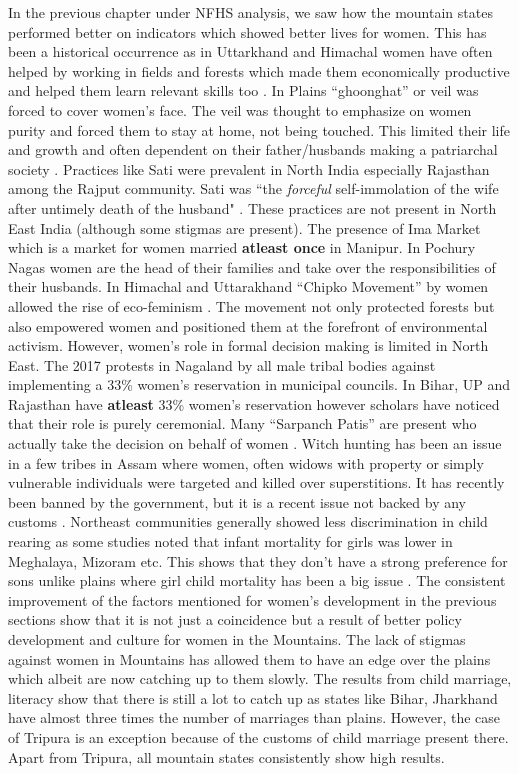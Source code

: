 In the previous chapter under NFHS analysis, we saw how the mountain states performed better on indicators which showed better lives for women. This has been a historical occurrence as in Uttarkhand and Himachal women have often helped by  working in fields and forests which made them economically productive and helped them learn relevant skills too \citep{gooch2014daughters}. In Plains ``ghoonghat'' or veil was forced to cover women's face. The veil was thought to emphasize on women purity and forced them to stay at home, not being touched. This limited their life and growth and often dependent on their father/husbands making a patriarchal society \citep{chowdhry1993persistence}. Practices like Sati were prevalent in North India especially Rajasthan among the Rajput community. Sati was ``the \textit{forceful} self-immolation of the wife after  untimely death of the husband" \citep{sangari1981sati}. These practices are not present in North East India (although some stigmas are present). The presence of Ima Market which is a market for  women married \textbf{atleast once} in Manipur. In Pochury Nagas women are the head of their families and take over the responsibilities of their husbands. In Himachal and Uttarakhand ``Chipko Movement'' by women allowed the rise of eco-feminism \citep{moore2011eco}. The movement not only protected forests but also empowered women and positioned them at the forefront of environmental activism.  However, women's role in formal decision making is limited in North East. The 2017 protests in Nagaland by all male tribal bodies against implementing a 33\% women's reservation in municipal councils.  In Bihar, UP and Rajasthan have \textbf{atleast} 33\% women's reservation however scholars have noticed that their role is purely ceremonial. Many ``Sarpanch Patis'' are present who actually take the decision on behalf of women \citep{rajasekhar2016women}. Witch hunting has been an issue in a few tribes in Assam where  women, often widows with property or simply vulnerable individuals were targeted and killed over superstitions. It has recently been banned by the government, but it is a recent issue not backed by any customs \citep{mishra2018targeting}.
Northeast communities generally showed less discrimination in child rearing as some studies noted that infant mortality for girls was lower in Meghalaya, Mizoram etc. This shows that they don't have a strong preference for sons unlike plains where girl child mortality has been a big issue \citep{mahanta2013gender}. The  consistent improvement of the factors mentioned for women's development in the previous sections show that it is not just a coincidence but a result of better policy development and culture for women in the Mountains. The lack of stigmas against women in Mountains has allowed them to have an edge over the plains which albeit are now catching up to them slowly. The results from child marriage, literacy show that there is still a lot to catch up as states like Bihar, Jharkhand have almost three times the number of marriages than plains. However, the case of Tripura is an exception because of the customs of child marriage present there. Apart from Tripura, all mountain states consistently show high results. 

